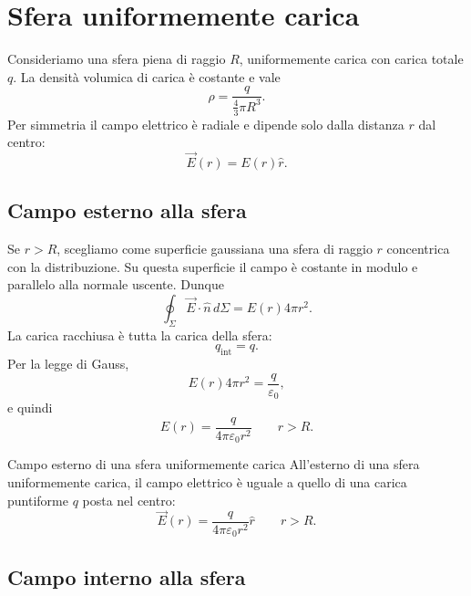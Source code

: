 \documentclass[a4paper]{article}
\begin{document}
\section{Sfera uniformemente carica}

Consideriamo una sfera piena di raggio \(R\), uniformemente carica con carica totale \(q\). La densità volumica di carica è costante e vale
\[
    \rho=\frac{q}{\frac{4}{3}\pi R^3}.
\]
Per simmetria il campo elettrico è radiale e dipende solo dalla distanza \(r\) dal centro:
\[
    \vec{E}(r)=E(r)\hat{r}.
\]

\begin{center}
\end{center}

\subsection{Campo esterno alla sfera}

Se \(r>R\), scegliamo come superficie gaussiana una sfera di raggio \(r\) concentrica con la distribuzione. Su questa superficie il campo è costante in modulo e parallelo alla normale uscente. Dunque
\[
    \oint_\Sigma \vec{E}\cdot\hat{n}\,d\Sigma=E(r)4\pi r^2.
\]
La carica racchiusa è tutta la carica della sfera:
\[
    q_{\mathrm{int}}=q.
\]
Per la legge di Gauss,
\[
    E(r)4\pi r^2=\frac{q}{\varepsilon_0},
\]
e quindi
\[
    E(r)=\frac{q}{4\pi\varepsilon_0r^2}\qquad r>R.
\]

\begin{snippetproposition}{Campo esterno di una sfera uniformemente carica}
    All'esterno di una sfera uniformemente carica, il campo elettrico è uguale a quello di una carica puntiforme \(q\) posta nel centro:
    \[
        \vec{E}(r)=\frac{q}{4\pi\varepsilon_0r^2}\hat{r}
        \qquad r>R.
    \]
\end{snippetproposition}

\subsection{Campo interno alla sfera}
\end{document}
